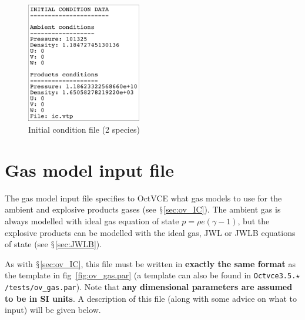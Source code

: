 \documentclass[pdftex, 12pt, a4paper]{report}
\begin{document}
\begin{figure}[htp]
\centering
\includegraphics[width=5cm]{pics/ov_IC_template.jpg}
\caption{Initial condition file (2 species)}
\label{fig:ov_IC.par}
\end{figure}

\pagebreak

\section{Gas model input file}\label{sec:ov_gas}

The gas model input file specifies to OctVCE what gas models to use for the ambient and explosive products gases (see
$\mathsection$\ref{sec:ov_IC}).  The ambient gas is always modelled with ideal gas equation of state $p = \rho e\left(\gamma-1\right)$,
but the explosive products can be modelled with the ideal gas, JWL or JWLB equations of state (see $\mathsection$\ref{sec:JWLB}).

As with $\mathsection$\ref{sec:ov_IC}, this file must be written 
in \textbf{exactly the same format} as the template in fig~\ref{fig:ov_gas.par} (a template can also be found 
in \verb'Octvce3.5.'$\star$\verb'/tests/ov_gas.par').  Note that \textbf{any dimensional parameters are assumed to be in SI units}.  A 
description of this file (along with some advice on what to input) will be given below.
\end{document}
